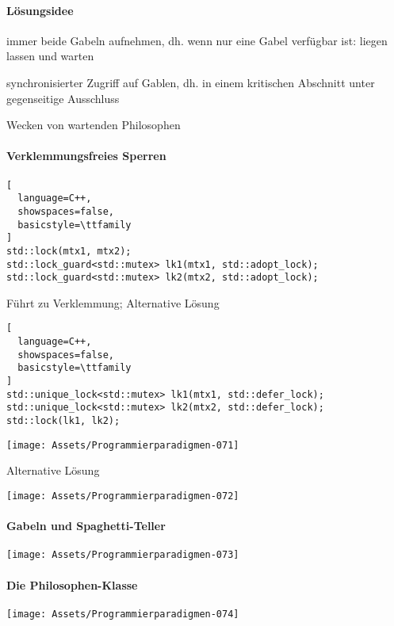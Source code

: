 \documentclass[10pt]{article}
\begin{document}
\paragraph{Lösungsidee}
\begin{itemize*}
  \item immer beide Gabeln aufnehmen, dh. wenn nur eine Gabel verfügbar ist: liegen lassen und warten
  \item synchronisierter Zugriff auf Gablen, dh. in einem kritischen Abschnitt unter gegenseitige Ausschluss
  \item Wecken von wartenden Philosophen
\end{itemize*}

\paragraph{Verklemmungsfreies Sperren}

\begin{lstlisting}[
  language=C++,
  showspaces=false,
  basicstyle=\ttfamily
]
std::lock(mtx1, mtx2);
std::lock_guard<std::mutex> lk1(mtx1, std::adopt_lock);
std::lock_guard<std::mutex> lk2(mtx2, std::adopt_lock);
\end{lstlisting}
Führt zu Verklemmung; Alternative Lösung
\begin{lstlisting}[
  language=C++,
  showspaces=false,
  basicstyle=\ttfamily
]
std::unique_lock<std::mutex> lk1(mtx1, std::defer_lock);
std::unique_lock<std::mutex> lk2(mtx2, std::defer_lock);
std::lock(lk1, lk2);
\end{lstlisting}

\begin{center}
  \texttt{[image: Assets/Programmierparadigmen-071]}
\end{center}
Alternative Lösung
\begin{center}
  \texttt{[image: Assets/Programmierparadigmen-072]}
\end{center}

\paragraph{Gabeln und Spaghetti-Teller}
\begin{center}
  \texttt{[image: Assets/Programmierparadigmen-073]}
\end{center}

\paragraph{Die Philosophen-Klasse}
\begin{center}
  \texttt{[image: Assets/Programmierparadigmen-074]}
\end{center}
\end{document}
